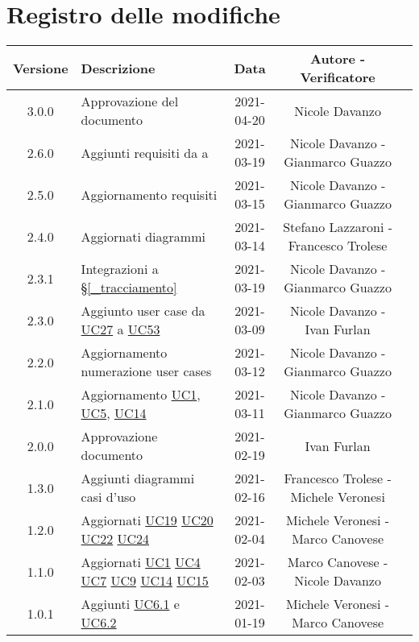 \section*{Registro delle modifiche}

\begin{center}
	\begin{longtable}{|c|p{5cm}|c|c|c|}
	\hline
	\rowcolor{lighter-grayer}
	\textbf{Versione} & \textbf{Descrizione} & \textbf{Data} & \textbf{Autore - Verificatore} \\
	\hline
	\endfirsthead

	\hline
	3.0.0 & Approvazione del documento & 2021-04-20 & Nicole Davanzo \\
	2.6.0 & Aggiunti requisiti da {F}{29} a {F}{43} & 2021-03-19 & Nicole Davanzo - Gianmarco Guazzo\\
	2.5.0 & Aggiornamento requisiti & 2021-03-15 & Nicole Davanzo - Gianmarco Guazzo\\
	2.4.0 & Aggiornati diagrammi & 2021-03-14 & Stefano Lazzaroni - Francesco Trolese\\
	2.3.1 & Integrazioni a \S\ref{_tracciamento}  & 2021-03-19 & Nicole Davanzo - Gianmarco Guazzo\\
	2.3.0 & Aggiunto user case da \hyperref[UC27]{UC27} a \hyperref[UC53]{UC53} & 2021-03-09 &  Nicole Davanzo - Ivan Furlan\\
	2.2.0 & Aggiornamento numerazione user cases & 2021-03-12 & Nicole Davanzo - Gianmarco Guazzo\\
	2.1.0 & Aggiornamento \hyperref[UC1]{UC1}, \hyperref[UC5]{UC5}, \hyperref[UC14]{UC14} & 2021-03-11 & Nicole Davanzo - Gianmarco Guazzo \\
	2.0.0 & Approvazione documento & 2021-02-19 & Ivan Furlan\\
	1.3.0 & Aggiunti diagrammi casi d'uso & 2021-02-16 & Francesco Trolese - Michele Veronesi \\
	1.2.0 & Aggiornati \hyperref[UC19]{UC19} \hyperref[UC20]{UC20} \hyperref[UC22]{UC22} \hyperref[UC24]{UC24} & 2021-02-04 & Michele Veronesi - Marco Canovese\\
	1.1.0 & Aggiornati \hyperref[UC1]{UC1} \hyperref[UC4]{UC4} \hyperref[UC7]{UC7} \hyperref[UC9]{UC9} \hyperref[UC14]{UC14} \hyperref[UC15]{UC15} & 2021-02-03 & Marco Canovese - Nicole Davanzo\\
	1.0.1 & Aggiunti \hyperref[UC6.1]{UC6.1} e \hyperref[UC6.2]{UC6.2} & 2021-01-19 & Michele Veronesi - Marco Canovese\\

\end{longtable}
\end{center}
